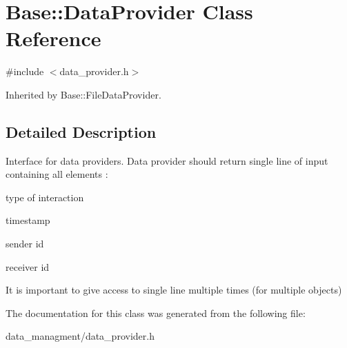 \hypertarget{classBase_1_1DataProvider}{\section{Base\-:\-:Data\-Provider Class Reference}
\label{classBase_1_1DataProvider}
}


{\ttfamily \#include $<$data\-\_\-provider.\-h$>$}



Inherited by Base\-::\-File\-Data\-Provider.



\subsection{Detailed Description}
Interface for data providers. Data provider should return single line of input containing all elements \-:
\begin{DoxyItemize}
\item type of interaction
\item timestamp
\item sender id
\item receiver id
\end{DoxyItemize}

It is important to give access to single line multiple times (for multiple objects) 

The documentation for this class was generated from the following file\-:\begin{DoxyCompactItemize}
\item 
data\-\_\-managment/data\-\_\-provider.\-h\end{DoxyCompactItemize}
